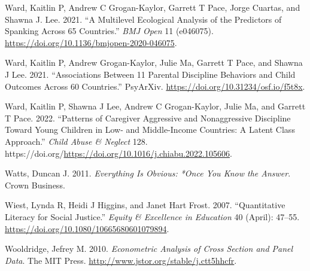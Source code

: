 \documentclass[
  letterpaper,
  DIV=11,
  numbers=noendperiod]{scrreprt}
\newlength{\cslhangindent}
\newlength{\cslentryspacingunit} %
\newenvironment{CSLReferences}[2] %
 {%
  \setlength{\parindent}{0pt}
  \ifodd #1
  \let\oldpar\par
  \def\par{\hangindent=\cslhangindent\oldpar}
  \fi
  \setlength{\parskip}{#2\cslentryspacingunit}
 }%
 {}
\begin{document}
\begin{CSLReferences}{1}{0}
\leavevmode{}%
Ward, Kaitlin P, Andrew C Grogan-Kaylor, Garrett T Pace, Jorge Cuartas,
and Shawna J. Lee. 2021. {``{A Multilevel Ecological Analysis of the
Predictors of Spanking Across 65 Countries}.''} \emph{BMJ Open} 11
(e046075). \url{https://doi.org/10.1136/bmjopen-2020-046075}.

\leavevmode{}%
Ward, Kaitlin P, Andrew Grogan-Kaylor, Julie Ma, Garrett T Pace, and
Shawna J Lee. 2021. {``Associations Between 11 Parental Discipline
Behaviors and Child Outcomes Across 60 Countries.''} PsyArXiv.
\url{https://doi.org/10.31234/osf.io/f5t8x}.

\leavevmode{}%
Ward, Kaitlin P, Shawna J Lee, Andrew C Grogan-Kaylor, Julie Ma, and
Garrett T Pace. 2022. {``{Patterns of Caregiver Aggressive and
Nonaggressive Discipline Toward Young Children in Low- and Middle-Income
Countries: A Latent Class Approach}.''} \emph{Child Abuse \& Neglect}
128. https://doi.org/\url{https://doi.org/10.1016/j.chiabu.2022.105606}.

\leavevmode{}%
Watts, Duncan J. 2011. \emph{Everything Is Obvious: *Once You Know the
Answer}. Crown Business.

\leavevmode{}%
Wiest, Lynda R, Heidi J Higgins, and Janet Hart Frost. 2007.
{``Quantitative Literacy for Social Justice.''} \emph{Equity \&
Excellence in Education} 40 (April): 47--55.
\url{https://doi.org/10.1080/10665680601079894}.

\leavevmode{}%
Wooldridge, Jefrey M. 2010. \emph{Econometric Analysis of Cross Section
and Panel Data}. The MIT Press.
\url{http://www.jstor.org/stable/j.ctt5hhcfr}.

\end{CSLReferences}
\end{document}
